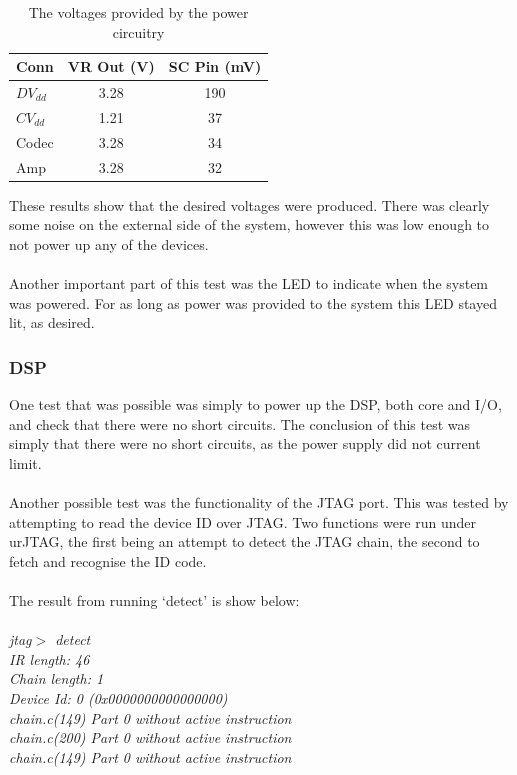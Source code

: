 \begin{table}[H]
	\centering
	\begin{tabular}[c]{| l | c | c |}
		\hline
		Conn		& VR Out (V)	& SC Pin (mV)	\\
		\hline
		$DV_{dd}$	& 3.28		& 190		\\
		$CV_{dd}$	& 1.21		& 37		\\
		Codec		& 3.28		& 34		\\
		Amp		& 3.28		& 32		\\
		\hline
	\end{tabular}
	\caption{The voltages provided by the power circuitry}
	\label{tab:powisotest}
\end{table}

\noindent These results show that the desired voltages were produced.
There was clearly some noise on the external side of the system, however this was low enough to not power up any of the devices.
\\
\\
Another important part of this test was the LED to indicate when the system was powered.
For as long as power was provided to the system this LED stayed lit, as desired.


\subsubsection{DSP}
One test that was possible was simply to power up the DSP, both core and I/O, and check that there were no short circuits.
The conclusion of this test was simply that there were no short circuits, as the power supply did not current limit.
\\
\\
Another possible test was the functionality of the JTAG port.
This was tested by attempting to read the device ID over JTAG.
Two functions were run under urJTAG, the first being an attempt to detect the JTAG chain, the second to fetch and recognise the ID code.
\\
\\
The result from running `detect' is show below:
\\
\\
\emph{
\indent jtag$>$ detect	\\
\indent IR  length: 46	\\
\indent Chain length: 1	\\
\indent Device Id: 0 (0x0000000000000000)	\\
\indent chain.c(149) Part 0 without active instruction	\\
\indent chain.c(200) Part 0 without active instruction	\\
\indent chain.c(149) Part 0 without active instruction	\\
}

